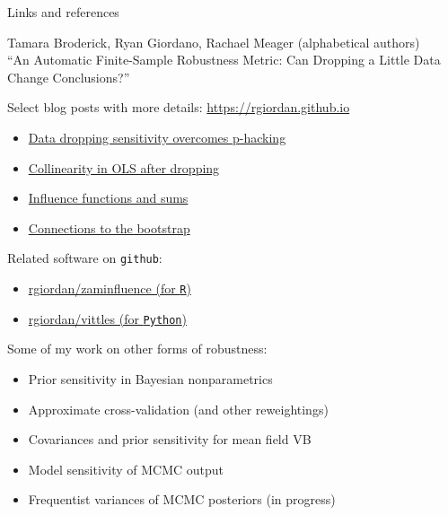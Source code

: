 \begin{frame}{Links and references}

\footnotesize

Tamara Broderick, Ryan Giordano, Rachael Meager
(alphabetical authors) \\
``An Automatic Finite-Sample Robustness Metric: Can Dropping a Little Data Change Conclusions?''

\hrulefill

Select blog posts with more details: \hspace{1em}\url{https://rgiordan.github.io}
\begin{itemize}
\item \href{https://rgiordan.github.io/robustness/2021/09/17/amip_p_hacking.html}
    {Data dropping sensitivity overcomes p-hacking}
\item \href{https://rgiordan.github.io/amip/2021/12/17/reweighted_colinear_note.html}
    {Collinearity in OLS after dropping}
\item \href{https://rgiordan.github.io/amip/2021/12/01/influence_is_sum.html}
    {Influence functions and sums}
\item \href{https://rgiordan.github.io/amip/2021/11/08/bootstrap_influence.html}
    {Connections to the bootstrap}
\end{itemize}


\hrulefill

Related software on \texttt{github}:
\begin{itemize}
\item \href{https://github.com/rgiordan/zaminfluence}
{rgiordan/zaminfluence (for \texttt{R})}
\item \href{https://github.com/rgiordan/vittles}
{rgiordan/vittles (for \texttt{Python})}
\end{itemize}

\hrulefill

Some of my work on other forms of robustness:
%
\begin{itemize}
    \item Prior sensitivity in Bayesian nonparametrics
        \citep{giordano2021bnp}
    \item Approximate cross-validation (and other reweightings)
        \citep{giordano2019swiss, giordano2019higherorder}
    \item Covariances and prior sensitivity for mean field VB
        \citep{giordano2015lrvbnips, giordano2018covariances}
    \item Model sensitivity of MCMC output \citep{giordano2018covariances}
    \item Frequentist variances of MCMC posteriors (in progress)
\end{itemize}

\end{frame}


